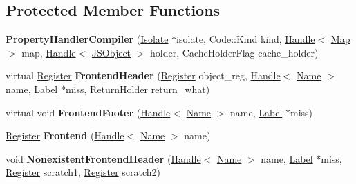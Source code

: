 \subsection*{Protected Member Functions}
\begin{DoxyCompactItemize}
\item 
{\bfseries Property\+Handler\+Compiler} (\hyperlink{classv8_1_1internal_1_1_isolate}{Isolate} $\ast$isolate, Code\+::\+Kind kind, \hyperlink{classv8_1_1internal_1_1_handle}{Handle}$<$ \hyperlink{classv8_1_1internal_1_1_map}{Map} $>$ map, \hyperlink{classv8_1_1internal_1_1_handle}{Handle}$<$ \hyperlink{classv8_1_1internal_1_1_j_s_object}{J\+S\+Object} $>$ holder, Cache\+Holder\+Flag cache\+\_\+holder)\hypertarget{classv8_1_1internal_1_1_property_handler_compiler_aaeaadad8c59c5b16f55f7d2679ca1073}{}\label{classv8_1_1internal_1_1_property_handler_compiler_aaeaadad8c59c5b16f55f7d2679ca1073}

\item 
virtual \hyperlink{structv8_1_1internal_1_1_register}{Register} {\bfseries Frontend\+Header} (\hyperlink{structv8_1_1internal_1_1_register}{Register} object\+\_\+reg, \hyperlink{classv8_1_1internal_1_1_handle}{Handle}$<$ \hyperlink{classv8_1_1internal_1_1_name}{Name} $>$ name, \hyperlink{classv8_1_1internal_1_1_label}{Label} $\ast$miss, Return\+Holder return\+\_\+what)\hypertarget{classv8_1_1internal_1_1_property_handler_compiler_ad68d450e4f7f7ebe47d018d387e66ade}{}\label{classv8_1_1internal_1_1_property_handler_compiler_ad68d450e4f7f7ebe47d018d387e66ade}

\item 
virtual void {\bfseries Frontend\+Footer} (\hyperlink{classv8_1_1internal_1_1_handle}{Handle}$<$ \hyperlink{classv8_1_1internal_1_1_name}{Name} $>$ name, \hyperlink{classv8_1_1internal_1_1_label}{Label} $\ast$miss)\hypertarget{classv8_1_1internal_1_1_property_handler_compiler_a70769f25637e653ba559753e00919c1d}{}\label{classv8_1_1internal_1_1_property_handler_compiler_a70769f25637e653ba559753e00919c1d}

\item 
\hyperlink{structv8_1_1internal_1_1_register}{Register} {\bfseries Frontend} (\hyperlink{classv8_1_1internal_1_1_handle}{Handle}$<$ \hyperlink{classv8_1_1internal_1_1_name}{Name} $>$ name)\hypertarget{classv8_1_1internal_1_1_property_handler_compiler_a2d355260d3c5388c65392c044183808b}{}\label{classv8_1_1internal_1_1_property_handler_compiler_a2d355260d3c5388c65392c044183808b}

\item 
void {\bfseries Nonexistent\+Frontend\+Header} (\hyperlink{classv8_1_1internal_1_1_handle}{Handle}$<$ \hyperlink{classv8_1_1internal_1_1_name}{Name} $>$ name, \hyperlink{classv8_1_1internal_1_1_label}{Label} $\ast$miss, \hyperlink{structv8_1_1internal_1_1_register}{Register} scratch1, \hyperlink{structv8_1_1internal_1_1_register}{Register} scratch2)\hypertarget{classv8_1_1internal_1_1_property_handler_compiler_a1378868a0eb5fd209acd2d40871e5360}{}\label{classv8_1_1internal_1_1_property_handler_compiler_a1378868a0eb5fd209acd2d40871e5360}


\end{DoxyCompactItemize}
